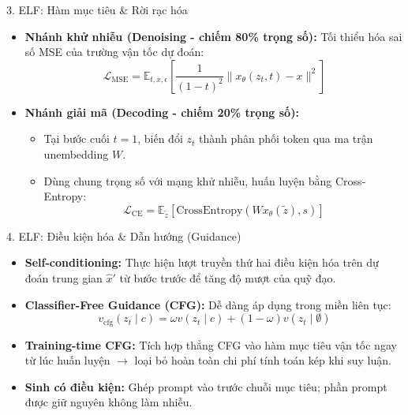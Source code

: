 \begin{frame}{3. ELF: Hàm mục tiêu \& Rời rạc hóa}
    \begin{itemize}
        \item \textbf{Nhánh khử nhiễu (Denoising - chiếm 80\% trọng số):} Tối thiểu hóa sai số MSE của trường vận tốc dự đoán:
        $$\mathcal{L}_{\text{MSE}} = \mathbb{E}_{t, x, \epsilon} \left[ \frac{1}{(1-t)^2} \|x_\theta(z_t, t) - x\|^2 \right]$$
        \item \textbf{Nhánh giải mã (Decoding - chiếm 20\% trọng số):}
        \begin{itemize}
            \item Tại bước cuối $t = 1$, biến đổi $z_t$ thành phân phối token qua ma trận unembedding $W$.
            \item Dùng chung trọng số với mạng khử nhiễu, huấn luyện bằng Cross-Entropy:
            $$\mathcal{L}_{\text{CE}} = \mathbb{E}_{\tilde{z}} \left[ \text{CrossEntropy}(W x_\theta(\tilde{z}), s) \right]$$
        \end{itemize}
    \end{itemize}
\end{frame}

\begin{frame}{4. ELF: Điều kiện hóa \& Dẫn hướng (Guidance)}
    \begin{itemize}
        \item \textbf{Self-conditioning:} Thực hiện lượt truyền thứ hai điều kiện hóa trên dự đoán trung gian $\hat{x}'$ từ bước trước để tăng độ mượt của quỹ đạo.
        \item \textbf{Classifier-Free Guidance (CFG):} Dễ dàng áp dụng trong miền liên tục:
        $$v_{\text{cfg}}(z_t \mid c) = \omega v(z_t \mid c) + (1 - \omega) v(z_t \mid \emptyset)$$
        \item \textbf{Training-time CFG:} Tích hợp thẳng CFG vào hàm mục tiêu vận tốc ngay từ lúc huấn luyện $\rightarrow$ loại bỏ hoàn toàn chi phí tính toán kép khi suy luận.
        \item \textbf{Sinh có điều kiện:} Ghép prompt vào trước chuỗi mục tiêu; phần prompt được giữ nguyên không làm nhiễu.
    \end{itemize}
\end{frame}

